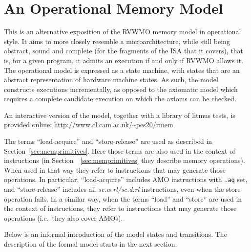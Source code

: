 \section{An Operational Memory Model}



This is an alternative exposition of the RVWMO memory model in operational style.
It aims to more closely resemble a microarchitecture, while still being abstract, sound and complete (for the fragments of the ISA that it covers), that is, for a given program, it admits an execution if and only if RVWMO allows it.
The operational model is expressed as a state machine, with states that are an abstract representation of hardware machine states.
As such, the model constructs executions incrementally, as opposed to the axiomatic model which requires a complete candidate execution on which the axioms can be checked.

An interactive version of the model, together with a library of litmus tests,
is provided online: \url{http://www.cl.cam.ac.uk/~pes20/rmem}

The terms ``load-acquire'' and ``store-release'' are used as described in Section~\ref{sec:memprimitives}.
Here those terms are also used in the context of instructions (in Section~~\ref{sec:memprimitives} they describe memory operations).
When used in that way they refer to instructions that may generate those operations.
In particular, ``load-acquire'' includes AMO instructions with {\tt .aq} set, and ``store-release'' includes all {\em sc.w.rl/sc.d.rl} instructions, even when the store operation fails.
In a similar way, when the terms ``load'' and ``store'' are used in the context of instructions, they refer to instructions that may generate those operations (i.e.~they also cover AMOs).

Below is an informal introduction of the model states and transitions.
The description of the formal model starts in the next section.

